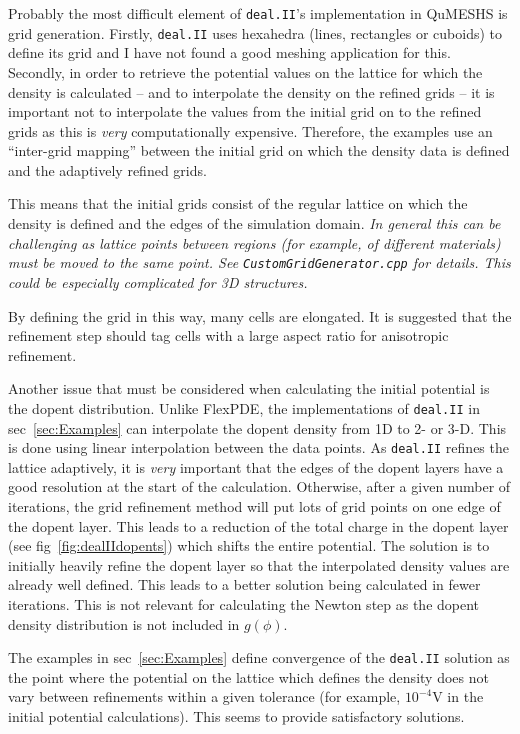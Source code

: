 \documentclass[12pt]{article}
\newcommand{\red}[1]{{\color{red} \it #1}}
\begin{document}
Probably the most difficult element of \texttt{deal.II}'s implementation in QuMESHS is
grid generation.  Firstly, \texttt{deal.II} uses hexahedra (lines, rectangles or cuboids)
to define its grid and I have not found a good meshing application for this.  Secondly,
in order to retrieve the potential values on the lattice for which the density is calculated
-- and to interpolate the density on the refined grids -- it is important not to
interpolate the values from the initial grid on to the refined grids as this is
\emph{\color{red} very} computationally expensive.  Therefore, the examples use an
``inter-grid mapping'' between the initial grid on which the density data is defined
and the adaptively refined grids.

This means that the initial grids consist of the regular lattice on which the density
is defined and the edges of the simulation domain.  \red{In general this can be
challenging as lattice points between regions (for example, of different materials)
must be moved to the same point.  See \texttt{CustomGridGenerator.cpp} for details.
This could be especially complicated for 3D structures.}

By defining the grid in this way, many cells are elongated.  It is suggested that
the refinement step should tag cells with a large aspect ratio for anisotropic
refinement.

Another issue that must be considered when calculating the initial potential is the
dopent distribution.  Unlike FlexPDE, the implementations of \texttt{deal.II} in
sec~\ref{sec:Examples} can interpolate the dopent density from 1D to 2- or 3-D.
This is done using linear interpolation between the data points.  As \texttt{deal.II}
refines the lattice adaptively, it is \emph{\color{red} very} important that the edges
of the dopent layers have a good resolution at the start of the calculation.  Otherwise,
after a given number of iterations, the grid refinement method will put lots of grid
points on one edge of the dopent layer.  This leads to a reduction of the total charge
in the dopent layer (see fig~\ref{fig:dealIIdopents}) which shifts the entire
potential.  The solution is to initially heavily refine the dopent layer so that the
interpolated density values are already well defined.  This leads to a better solution
being calculated in fewer iterations.  This is not relevant for calculating the
Newton step as the dopent density distribution is not included in $g(\phi)$.

The examples in sec~\ref{sec:Examples} define convergence of the \texttt{deal.II}
solution as the point where the potential on the lattice which defines the density
does not vary between refinements within a given tolerance (for example, $10^{-4}$V
in the initial potential calculations).  This seems to provide satisfactory
solutions.
\end{document}
